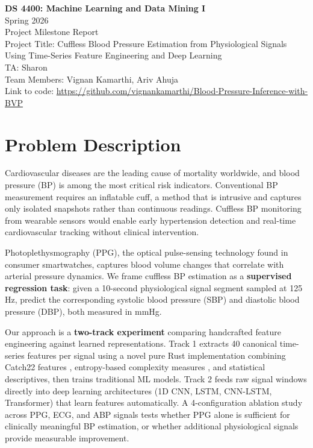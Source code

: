 \documentclass[11pt]{article}
\begin{document}
\begin{center}
{\Large \textbf{DS 4400: Machine Learning and Data Mining I}} \\[0.3em]
{\large Spring 2026} \\[0.3em]
{\large Project Milestone Report} \\[1em]
{\large Project Title: Cuffless Blood Pressure Estimation from Physiological Signals \\
Using Time-Series Feature Engineering and Deep Learning} \\[0.8em]
TA: Sharon \\
Team Members: Vignan Kamarthi, Ariv Ahuja \\[0.5em]
Link to code: \url{https://github.com/vignankamarthi/Blood-Pressure-Inference-with-BVP}
\end{center}

\section{Problem Description}

Cardiovascular diseases are the leading cause of mortality worldwide, and blood pressure (BP) is among the most critical risk indicators. Conventional BP measurement requires an inflatable cuff, a method that is intrusive and captures only isolated snapshots rather than continuous readings. Cuffless BP monitoring from wearable sensors would enable early hypertension detection and real-time cardiovascular tracking without clinical intervention.

Photoplethysmography (PPG), the optical pulse-sensing technology found in consumer smartwatches, captures blood volume changes that correlate with arterial pressure dynamics. We frame cuffless BP estimation as a \textbf{supervised regression task}: given a 10-second physiological signal segment sampled at 125 Hz, predict the corresponding systolic blood pressure (SBP) and diastolic blood pressure (DBP), both measured in mmHg.

Our approach is a \textbf{two-track experiment} comparing handcrafted feature engineering against learned representations. Track 1 extracts 40 canonical time-series features per signal using a novel pure Rust implementation combining Catch22 features \citep{lubba2019catch22}, entropy-based complexity measures \citep{bandt2002permutation, rosso2007distinguishing}, and statistical descriptives, then trains traditional ML models. Track 2 feeds raw signal windows directly into deep learning architectures (1D CNN, LSTM, CNN-LSTM, Transformer) that learn features automatically. A 4-configuration ablation study across PPG, ECG, and ABP signals tests whether PPG alone is sufficient for clinically meaningful BP estimation, or whether additional physiological signals provide measurable improvement.
\end{document}
